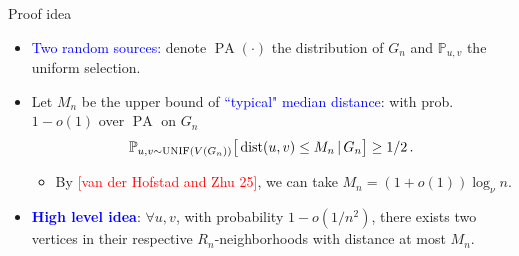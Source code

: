 \documentclass{beamer}
\theoremstyle{plain}
\theoremstyle{definition}
\begin{document}
\begin{frame}{Proof idea}
\footnotesize
\begin{itemize}
    \item\pause \textcolor{blue}{Two random sources: }denote $\operatorname{PA}(\cdot)$ the distribution of $G_n$ and $\mathbb P_{u,v}$ the uniform selection.
    \item\pause Let $M_n$ be the upper bound of \textcolor{blue}{``typical" median distance}: with prob. $1-o(1)$ over $\operatorname{PA}$ on $G_n$
    \begin{equation}
        \mathbb P_{u,v\sim \operatorname{UNIF}(V(G_n))}\big[\operatorname{dist}(u,v)\leq M_n\,|\,G_n\big]\geq 1/2\,.\notag
    \end{equation}
    \begin{itemize}
        \item By \textcolor{red}{[van der Hofstad and Zhu 25]}, we can take $M_n=(1+o(1))\log_\nu n$.
    \end{itemize}
    \item\pause \textcolor{blue}{\textbf{High level idea}}: $\forall u,v$, with probability $1-o(1/n^2)$, there exists two vertices in their respective $R_n$-neighborhoods with distance at most $M_n$.
\begin{figure}[h]
\centering
{}
\end{figure}
\end{itemize}
\end{frame}
\end{document}
